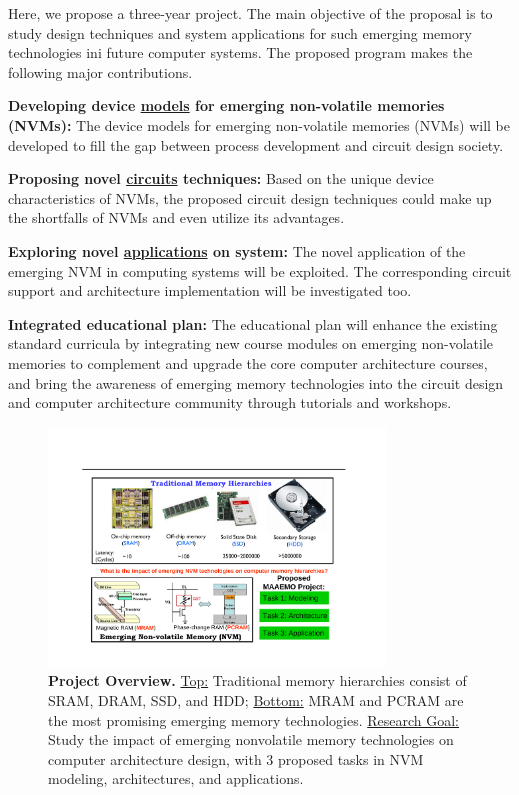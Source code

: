 Here, we propose a three-year project. The main objective of the proposal is to study design techniques and system
applications for such emerging memory technologies ini future computer systems. The proposed program makes the
following major contributions.
\vspace{5pt}
\squishlist
\item {\textbf{Developing device \underline{models} for emerging non-volatile memories (NVMs):} The device models for emerging non-volatile memories (NVMs) will be developed to fill the gap between process development and circuit design society.}
\item {\textbf{Proposing novel \underline{circuits} techniques:} Based on the unique device characteristics of NVMs, the proposed circuit design techniques could make up the
shortfalls of NVMs and even utilize its advantages. }
\item {\textbf{Exploring novel \underline{applications} on system:} The novel application of the emerging NVM in computing systems will be exploited. The corresponding circuit support and architecture implementation will be investigated too.}
\item {\textbf{Integrated educational plan:} The educational plan will enhance the existing standard curricula by integrating
new course modules on emerging non-volatile memories to complement and upgrade the core computer architecture courses,
and bring the awareness of emerging memory technologies into the circuit design and computer architecture community through
tutorials and workshops.}
\squishend
\vspace{5pt}

\begin{figure}%
\centering \includegraphics[width=0.8\textwidth]{./figure/mem-hierarchy.pdf}    \vspace{-10pt}
\caption{\textbf{Project Overview.} \underline{Top:} Traditional memory hierarchies consist of SRAM, DRAM, SSD, and HDD; \underline{Bottom:} MRAM and PCRAM are the most promising emerging memory technologies.  \underline{Research Goal:} Study the impact of emerging nonvolatile memory technologies on computer architecture design, with 3 proposed tasks in NVM modeling, architectures, and applications. }\label{mem-hierarchy} \vspace{-10pt}
\end{figure}


